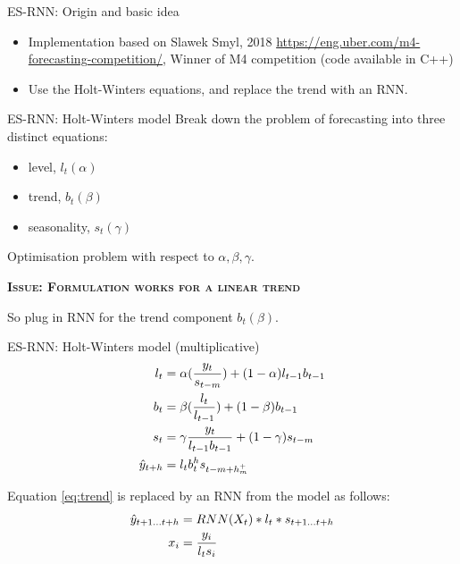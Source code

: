 \documentclass[aspectratio=169, 12pt]{beamer}
\begin{document}
\begin{frame}{ES-RNN: Origin and basic idea}
\begin{itemize}
    \item Implementation based on Slawek Smyl\cite{slawek}, 2018
\url{https://eng.uber.com/m4-forecasting-competition/}, Winner of M4 competition\cite{m4} (code available in C++)
    \item Use the Holt-Winters equations\cite{winters}, and replace the trend with an RNN.
\end{itemize}
\end{frame}

\begin{frame}{ES-RNN: Holt-Winters model}
Break down the problem of forecasting into three distinct equations:
\begin{itemize}
    \item level, $l_t (\alpha)$
    \item trend, $b_t (\beta)$
    \item seasonality, $s_{t} (\gamma)$ 
\end{itemize}
Optimisation problem with respect to $\alpha, \beta, \gamma$.
\begin{center}
    \textsc{\textbf{Issue: Formulation works for a linear trend}}
\end{center}
So plug in RNN for the trend component $b_t (\beta)$.
\end{frame}

\begin{frame}{ES-RNN: Holt-Winters model (multiplicative)}
\begin{align}
    l_t &= \alpha(\frac{y_t}{s_{t-m}}) + (1 - \alpha)l_{t-1} b_{t-1} \label{eq:level}\\
    b_t &= \beta(\frac{l_t}{l_{t-1}}) + (1- \beta) b_{t-1} \label{eq:trend} \\ 
    s_{t} &= \gamma \frac{y_t}{l_{t-1} b_{t-1}} + (1-\gamma)s_{t-m} \label{eq:season}\\
    \Hat{y}_{t+h} &= l_t  b_t^h s_{t-m+h^+_m} \label{eq:predEq}
\end{align}

Equation \ref{eq:trend} is replaced by an RNN from the model as follows:
\begin{align}
    \Hat{y}_{t+1 \dots t+h} &= RNN(X_t) * l_t * s_{t+1 \dots t+h} \label{eq:modifiedEq}\\
    x_i &= \frac{y_i}{l_t s_i} \label{eq:x}
\end{align}
\end{frame}
\end{document}
